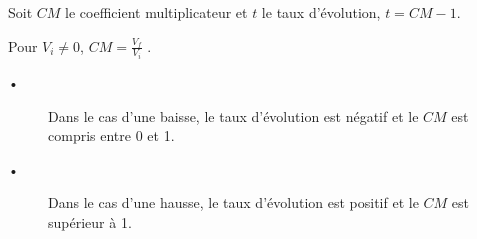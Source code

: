 

\begin{minipage}{0.58\linewidth}
\begin{Th} 

Soit $CM$ le coefficient multiplicateur et $t$ le taux d'évolution, $t =CM-1$. 
\end{Th}
\end{minipage}
\hfill
\begin{minipage}{0.38\linewidth}

\begin{Rq} 
Pour $V_i \neq 0$, $CM=\frac{V_f}{V_i}$ . 
\end{Rq}
\end{minipage}


\begin{Th} 
\begin{description}
\item[•] Dans le cas d'une baisse, le taux d'évolution est négatif et le $CM$ est compris entre 0 et 1.
\item[•] Dans le cas d'une hausse, le taux d'évolution est positif et le $CM$ est supérieur à 1.
\end{description}

 
\end{Th}







 

